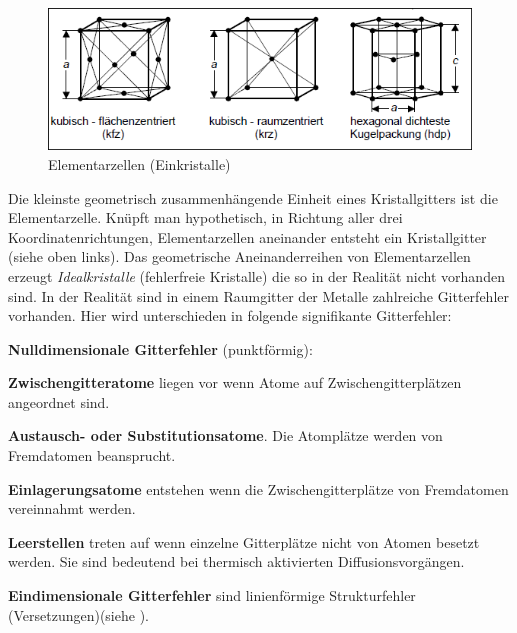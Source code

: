 \documentclass[12pt,a4paper,parskip,twoside,BCOR5mm,headsepline]{scrartcl}
\begin{document}
\begin{description*}
{\begin{itemize*}
\end{itemize*}
\begin{figure}
\centering
\includegraphics[width=.8\textwidth]{elementarzellen}
\caption[Elementarzellen]{Elementarzellen (Einkristalle)\autocite[37]{hu}}
\label{fig:elementarzellen}
\end{figure}





Die kleinste geometrisch zusammenhängende Einheit eines Kristallgitters ist die Elementarzelle. Knüpft man hypothetisch, in Richtung aller drei Koordinatenrichtungen, Elementarzellen aneinander entsteht ein Kristallgitter (siehe  oben links). Das geometrische Aneinanderreihen von Elementarzellen erzeugt \emph{Idealkristalle} (fehlerfreie Kristalle) die so in der Realität nicht vorhanden sind. In der Realität sind in einem Raumgitter der Metalle zahlreiche Gitterfehler vorhanden. Hier wird unterschieden in folgende signifikante Gitterfehler:
\begin{enumerate*}
\item  \textbf{Nulldimensionale Gitterfehler} (punktförmig):
\begin{itemize*}
\item \textbf{Zwischengitteratome} liegen vor wenn Atome auf Zwischengitterplätzen angeordnet sind. 
\item \textbf{Austausch- oder Substitutionsatome}. Die Atomplätze werden von Fremdatomen beansprucht.
\item \textbf{Einlagerungsatome} entstehen wenn die Zwischengitterplätze von Fremdatomen vereinnahmt werden.
\item \textbf{Leerstellen} treten auf  wenn einzelne Gitterplätze nicht von Atomen besetzt werden. Sie sind bedeutend bei thermisch aktivierten Diffusionsvorgängen.
\end{itemize*}
\item \textbf{Eindimensionale Gitterfehler} sind linienförmige Strukturfehler (Versetzungen)(siehe ).


\end{enumerate*}}
\end{description*}
\end{document}
